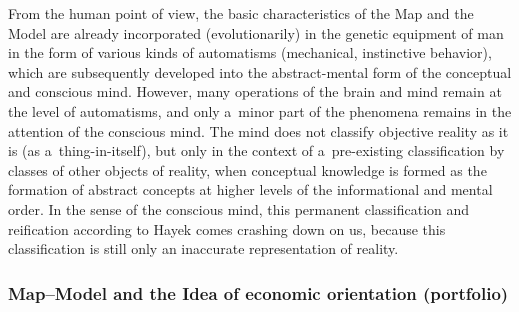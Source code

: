 From the human point of view, the basic characteristics of the Map and the Model are already incorporated (evolutionarily) in the genetic equipment of man in the form of various kinds of automatisms (mechanical, instinctive behavior), which are subsequently developed into the abstract-mental form of the conceptual and conscious mind. However, many operations of the brain and mind remain at the level of automatisms, and only a~minor part of the phenomena remains in the attention of the conscious mind. The mind does not classify objective reality as it is (as a~thing-in-itself), but only in the context of a~pre-existing classification by classes of other objects of reality, when conceptual knowledge is formed as the formation of abstract concepts at higher levels of the informational and mental order. In the sense of the conscious mind, this permanent classification and reification according to Hayek 
\parencite*[][sec.6.47]{} %
 comes crashing down on us, because this classification is still only an inaccurate representation of reality.



\subsubsection*{Map–Model and the Idea of economic orientation (portfolio) }



